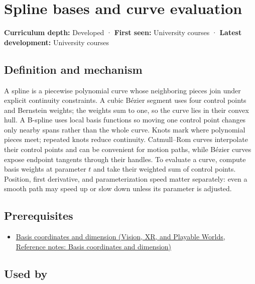 \hypertarget{appendix-f28eeec97a3d}{}\label{referencestart:appendix-f28eeec97a3d}
\section{Spline bases and curve evaluation}\label{appendix-f28eeec97a3d-spline-bases-and-curve-evaluation}

\textbf{Curriculum depth:} Developed · \textbf{First seen:} University courses · \textbf{Latest development:} University courses

\subsection{Definition and mechanism}\label{appendix-f28eeec97a3d-definition-and-mechanism}

A spline is a piecewise polynomial curve whose neighboring pieces join under explicit continuity constraints. A cubic Bézier segment uses four control points and Bernstein weights; the weights sum to one, so the curve lies in their convex hull. A B-spline uses local basis functions so moving one control point changes only nearby spans rather than the whole curve. Knots mark where polynomial pieces meet; repeated knots reduce continuity. Catmull--Rom curves interpolate their control points and can be convenient for motion paths, while Bézier curves expose endpoint tangents through their handles. To evaluate a curve, compute basis weights at parameter \(t\) and take their weighted sum of control points. Position, first derivative, and parameterization speed matter separately: even a smooth path may speed up or slow down unless its parameter is adjusted.

\subsection{Prerequisites}\label{appendix-f28eeec97a3d-prerequisites}

\begin{itemize}
\tightlist
\item
  \href{../07-Vision-XR-and-Playable-Worlds/main.pdf\#nameddest=appendix-ce0341f7ea0d}{Basis coordinates and dimension (Vision, XR, and Playable Worlds, Reference notes: Basis coordinates and dimension)}
\end{itemize}

\subsection{Used by}\label{appendix-f28eeec97a3d-used-by}

